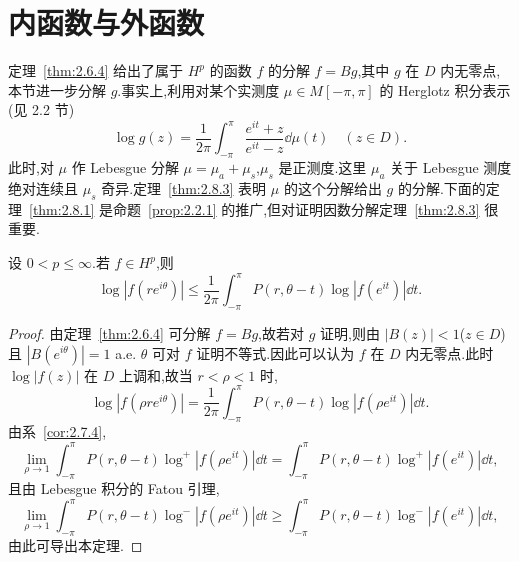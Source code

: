 \section{内函数与外函数}\label{sec:2.8}


定理~\ref{thm:2.6.4} 给出了属于 $H^{p}$ 的函数 $f$ 的分解 $f = Bg$,其中 $g$ 在 $D$ 内无零点,本节进一步分解 $g$.事实上,利用对某个实测度 $\mu \in M[-\pi, \pi]$ 的 Herglotz 积分表示(见 2.2 节)
\begin{equation*}
\log g(z) = \frac{1}{2\pi}\int_{-\pi}^{\pi}\frac{e^{it} + z}{e^{it} - z}\dd\mu(t) \quad (z \in D).
\end{equation*}
此时,对 $\mu$ 作 Lebesgue 分解 $\mu = \mu_{a} + \mu_{s}$,$\mu_{s}$ 是正测度.这里 $\mu_{a}$ 关于 Lebesgue 测度绝对连续且 $\mu_{s}$ 奇异.定理~\ref{thm:2.8.3} 表明 $\mu$ 的这个分解给出 $g$ 的分解.下面的定理~\ref{thm:2.8.1} 是命题~\ref{prop:2.2.1} 的推广,但对证明因数分解定理~\ref{thm:2.8.3} 很重要.

\begin{theorem}\label{thm:2.8.1}
设 $0 < p \leq \infty$.若 $f \in H^{p}$,则
\begin{equation*}
\log|f(re^{i\theta})| \leq \frac{1}{2\pi}\int_{-\pi}^{\pi}P(r, \theta - t)\log|f(e^{it})|\dd t.
\end{equation*}
\end{theorem}

\begin{proof}
由定理~\ref{thm:2.6.4} 可分解 $f = Bg$,故若对 $g$ 证明,则由 $|B(z)| < 1$($z \in D$)且 $|B(e^{i\theta})| = 1$ a.e. $\theta$ 可对 $f$ 证明不等式.因此可以认为 $f$ 在 $D$ 内无零点.此时 $\log|f(z)|$ 在 $D$ 上调和,故当 $r < \rho < 1$ 时,
\begin{equation*}
\log|f(\rho re^{i\theta})| = \frac{1}{2\pi}\int_{-\pi}^{\pi}P(r, \theta - t)\log|f(\rho e^{it})|\dd t.
\end{equation*}
由系~\ref{cor:2.7.4},
\begin{equation*}
\lim_{\rho \to 1}\int_{-\pi}^{\pi}P(r, \theta - t)\log^{+}|f(\rho e^{it})|\dd t = \int_{-\pi}^{\pi}P(r, \theta - t)\log^{+}|f(e^{it})|\dd t,
\end{equation*}
且由 Lebesgue 积分的 Fatou 引理,
\begin{equation*}
\lim_{\rho \to 1}\int_{-\pi}^{\pi}P(r, \theta - t)\log^{-}|f(\rho e^{it})|\dd t \geq \int_{-\pi}^{\pi}P(r, \theta - t)\log^{-}|f(e^{it})|\dd t,
\end{equation*}
由此可导出本定理.
\end{proof}

